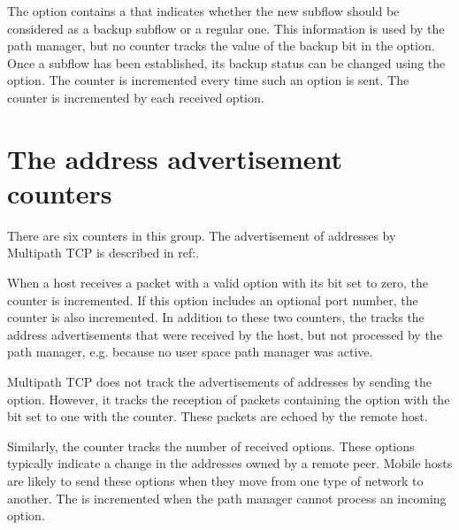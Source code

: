 \documentclass[letterpaper,10pt,english]{sphinxmanual}
\begin{document}
\sphinxAtStartPar
The  option contains a  that indicates whether the new
subflow should be considered as a backup subflow or a regular one. This
information is used by the path manager, but no counter tracks the value of
the backup bit in the  option. Once a subflow has been established,
its backup status can be changed using the  option. The
 counter is incremented every time such an option is sent.
The  counter is incremented by each received 
option.


\section{The address advertisement counters}
\label{\detokenize{nstat-mptcp:the-address-advertisement-counters}}
\sphinxAtStartPar
There are six counters in this group. The advertisement of addresses by
Multipath TCP is described in ref:.

\sphinxAtStartPar
When a host receives a packet with a valid  option with its
 bit set to zero, the  counter is incremented.
If this option includes an optional port number, the 
counter is also incremented. In addition to these two counters, the
 tracks the address advertisements that were received
by the host, but not processed by the path manager, e.g. because no user
space path manager was active.

\sphinxAtStartPar
Multipath TCP does not track the advertisements of addresses by sending
the  option. However, it tracks the reception of packets
containing the  option with the  bit set to one with
the  counter. These packets are echoed by the remote host.

\sphinxAtStartPar
Similarly, the  counter tracks the number of received
 options. These options typically indicate a change in the
addresses owned by a remote peer. Mobile hosts are likely to send these
options when they move from one type of network to another. The
 is incremented when the path manager cannot process an
incoming  option.
\end{document}
